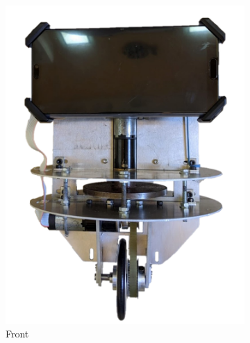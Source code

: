 \documentclass[twoside,twocolumn,12pt]{article}
\begin{document}


\clearpage
\begin{figure}
\centering
\begin{subfigure}[t]{0.49\textwidth}
    \includegraphics[width=\linewidth]{frontnewt}
   \caption{Front}
  \label{sub:frontnew}
  \end{subfigure}
  \begin{subfigure}[t]{0.49\textwidth}

\end{subfigure}
\end{figure}
\end{document}
